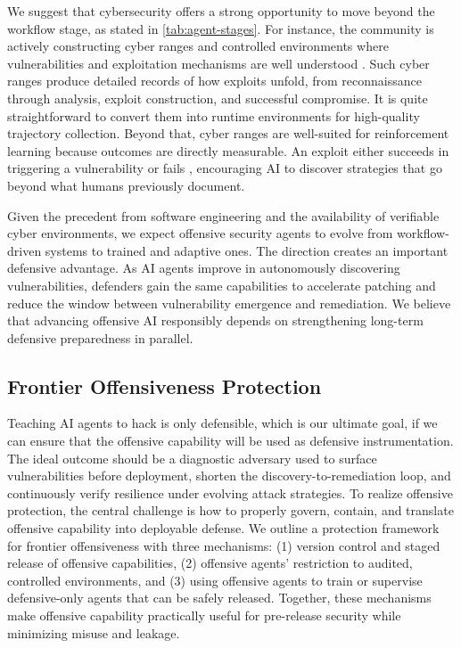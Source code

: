 \documentclass{article}
\theoremstyle{plain}
\theoremstyle{definition}
\theoremstyle{remark}
\begin{document}
We suggest that cybersecurity offers a strong opportunity to move beyond the workflow stage, as stated in \autoref{tab:agent-stages}. For instance, the community is actively constructing cyber ranges and controlled environments where vulnerabilities and exploitation mechanisms are well understood \citep{ferguson2014national,yamin2020cyber}. Such cyber ranges produce detailed records of how exploits unfold, from reconnaissance through analysis, exploit construction, and successful compromise. It is quite straightforward to convert them into runtime environments for high-quality trajectory collection. Beyond that, cyber ranges are well-suited for reinforcement learning because outcomes are directly measurable. An exploit either succeeds in triggering a vulnerability or fails \citep{zhu2025cvebench,wang2025cybergym}, encouraging AI to discover strategies that go beyond what humans previously document.



Given the precedent from software engineering and the availability of verifiable cyber environments, we expect offensive security agents to evolve from workflow-driven systems to trained and adaptive ones. The direction creates an important defensive advantage. As AI agents improve in autonomously discovering vulnerabilities, defenders gain the same capabilities to accelerate patching and reduce the window between vulnerability emergence and remediation. We believe that advancing offensive AI responsibly depends on strengthening long-term defensive preparedness in parallel.

\subsection{Frontier Offensiveness Protection}


Teaching AI agents to hack is only defensible, which is our ultimate goal, if we can ensure that the offensive capability will be used as defensive instrumentation. The ideal outcome should be a diagnostic adversary used to surface vulnerabilities before deployment, shorten the discovery-to-remediation loop, and continuously verify resilience under evolving attack strategies. To realize offensive protection, the central challenge is how to properly govern, contain, and translate offensive capability into deployable defense. We outline a protection framework for frontier offensiveness with three mechanisms: (1) version control and staged release of offensive capabilities, (2) offensive agents' restriction to audited, controlled environments, and (3) using offensive agents to train or supervise defensive-only agents that can be safely released. Together, these mechanisms make offensive capability practically useful for pre-release security while minimizing misuse and leakage.
\end{document}
